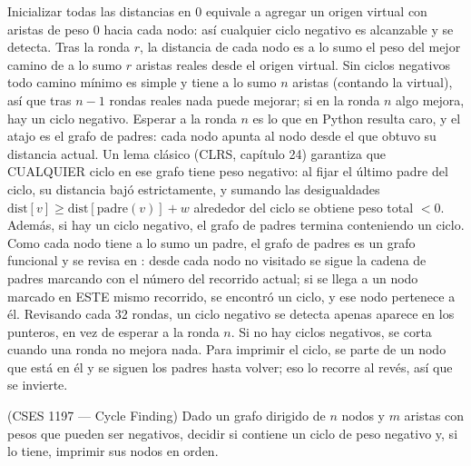  Inicializar todas las distancias en 0 equivale a agregar un origen virtual con aristas de peso 0 hacia cada nodo: así cualquier ciclo negativo es alcanzable y se detecta. Tras la ronda $r$, la distancia de cada nodo es a lo sumo el peso del mejor camino de a lo sumo $r$ aristas reales desde el origen virtual. Sin ciclos negativos todo camino mínimo es simple y tiene a lo sumo $n$ aristas (contando la virtual), así que tras $n-1$ rondas reales nada puede mejorar; si en la ronda $n$ algo mejora, hay un ciclo negativo. Esperar a la ronda $n$ es lo que en Python resulta caro, y el atajo es el grafo de padres: cada nodo apunta al nodo desde el que obtuvo su distancia actual. Un lema clásico (CLRS, capítulo 24) garantiza que CUALQUIER ciclo en ese grafo tiene peso negativo: al fijar el último padre del ciclo, su distancia bajó estrictamente, y sumando las desigualdades $\text{dist}[v] \ge \text{dist}[\text{padre}(v)] + w$ alrededor del ciclo se obtiene peso total $< 0$. Además, si hay un ciclo negativo, el grafo de padres termina conteniendo un ciclo. Como cada nodo tiene a lo sumo un padre, el grafo de padres es un grafo funcional y se revisa en : desde cada nodo no visitado se sigue la cadena de padres marcando con el número del recorrido actual; si se llega a un nodo marcado en ESTE mismo recorrido, se encontró un ciclo, y ese nodo pertenece a él. Revisando cada 32 rondas, un ciclo negativo se detecta apenas aparece en los punteros, en vez de esperar a la ronda $n$. Si no hay ciclos negativos, se corta cuando una ronda no mejora nada. Para imprimir el ciclo, se parte de un nodo que está en él y se siguen los padres hasta volver; eso lo recorre al revés, así que se invierte.~\cite{bellman1958}


(CSES 1197 — Cycle Finding) Dado un grafo dirigido de $n$ nodos y $m$ aristas con pesos que pueden ser negativos, decidir si contiene un ciclo de peso negativo y, si lo tiene, imprimir sus nodos en orden.

